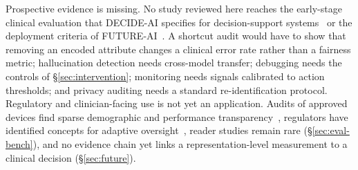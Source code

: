Prospective evidence is missing. No study reviewed here reaches the early-stage clinical evaluation that
DECIDE-AI specifies for decision-support systems~\cite{vasey2022decide} or the deployment criteria of
FUTURE-AI~\cite{lekadir2023future}. A shortcut audit would have to show that removing an encoded
attribute changes a clinical error rate rather than a fairness metric; hallucination detection needs
cross-model transfer; debugging needs the controls of \S\ref{sec:intervention}; monitoring needs signals
calibrated to action thresholds; and privacy auditing needs a standard re-identification protocol.
Regulatory and clinician-facing use is not yet an application. Audits of approved devices find sparse
demographic and performance transparency~\cite{muralidharan2024a,mehta2025evaluating}, regulators have
identified concepts for adaptive oversight~\cite{warraich2024fda}, reader studies remain rare
(\S\ref{sec:eval-bench}), and no evidence chain yet links a representation-level measurement to a
clinical decision (\S\ref{sec:future}).
